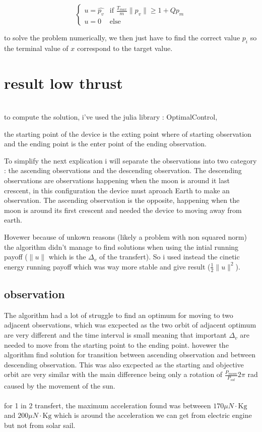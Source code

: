 \documentclass[11pt]{article} %
\begin{document}
			$$
			\begin{cases}
				 u =\widehat{p_v} & \text{if }\frac{T_ {max}}{m}\|p_v\| \ge 1+Qp_m\\
				 u =0 & \text{else}
			\end{cases}
			$$
			
			to solve the problem numerically, we then just have to find the correct value $p_i$ so the terminal value of $x$ correspond to the target value.
			
			\section{result low thrust}
				\\
			to compute the solution, i've used the julia library : OptimalControl,
			
			the starting point of the device is the exting point where of starting observation and the ending point is the enter point of the ending observation.
			
			To simplify the next explication i will separate the observations into two category : the ascending observations and the descending observation. The descending observations are observations happening when the moon is around it last crescent, in this configuration the device must aproach Earth to make an observation. The ascending observation is the opposite, happening when the moon is around its first crescent and needed the device to moving away from earth.
			
			Hovewer because of unkown reasons (likely a problem with non squared norm) the algorithm didn't manage to find solutions when using the intial running payoff ($\|u\|$ which is the $\Delta_v$ of the transfert). So i used instead the cinetic energy running payoff which was way more stable and give result ($\frac{1}{2}\|u\|^2$).
			
			\subsection{observation}
			The algorithm had a lot of struggle to find an optimum for moving to two adjacent observations, which was excpected as the two orbit of adjacent optimum are very different and the time interval is small meaning that important $\Delta_v$ are needed to move from the starting point to the ending point. hovewer the algorithm find solution for transition between ascending observation and between descending observation. This was also excpected as the starting and objective orbit are very similar with the main difference being only a rotation of $\frac{P_{moon}}{P_{sol}}2\pi $ rad caused by the movement of the sun.
			\\ \\
			for 1 in 2 transfert, the maximum acceleration found was betweeen $170 \mu{N}\cdot\text{Kg}$ and $200 \mu{N}\cdot\text{Kg}$ which is around the acceleration we can get from electric engine but not from solar sail.
		
\end{document}
